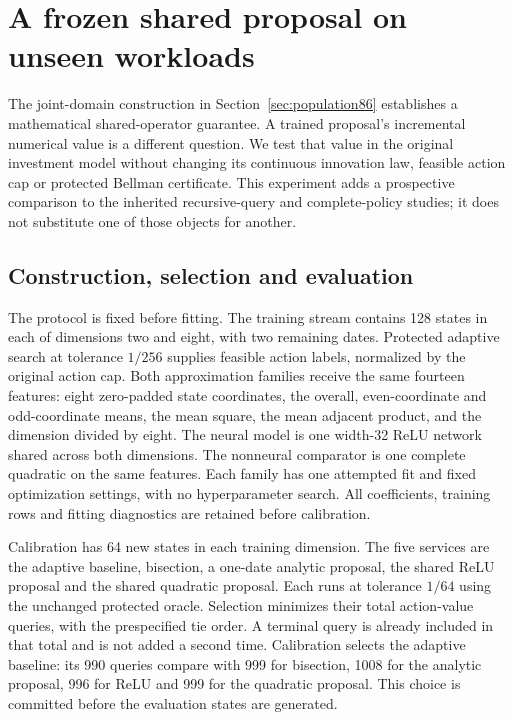 \section{A frozen shared proposal on unseen workloads}\label{sec:sharedstudy89}
The joint-domain construction in Section~\ref{sec:population86} establishes a mathematical shared-operator guarantee. A trained proposal's incremental numerical value is a different question. We test that value in the original investment model without changing its continuous innovation law, feasible action cap or protected Bellman certificate. This experiment adds a prospective comparison to the inherited recursive-query and complete-policy studies; it does not substitute one of those objects for another.

\subsection{Construction, selection and evaluation}
The protocol is fixed before fitting. The training stream contains 128 states in each of dimensions two and eight, with two remaining dates. Protected adaptive search at tolerance $1/256$ supplies feasible action labels, normalized by the original action cap. Both approximation families receive the same fourteen features: eight zero-padded state coordinates, the overall, even-coordinate and odd-coordinate means, the mean square, the mean adjacent product, and the dimension divided by eight. The neural model is one width-32 ReLU network shared across both dimensions. The nonneural comparator is one complete quadratic on the same features. Each family has one attempted fit and fixed optimization settings, with no hyperparameter search. All coefficients, training rows and fitting diagnostics are retained before calibration.

Calibration has 64 new states in each training dimension. The five services are the adaptive baseline, bisection, a one-date analytic proposal, the shared ReLU proposal and the shared quadratic proposal. Each runs at tolerance $1/64$ using the unchanged protected oracle. Selection minimizes their total action-value queries, with the prespecified tie order. A terminal query is already included in that total and is not added a second time. Calibration selects the adaptive baseline: its 990 queries compare with 999 for bisection, 1008 for the analytic proposal, 996 for ReLU and 999 for the quadratic proposal. This choice is committed before the evaluation states are generated.

